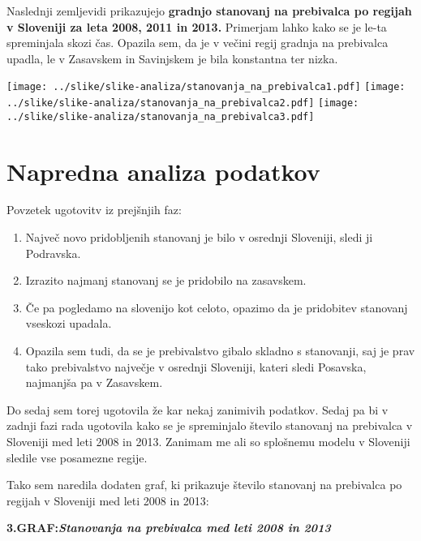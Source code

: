 \documentclass[11pt,a4paper]{article}
\begin{document}
Naslednji zemljevidi prikazujejo \textbf{gradnjo stanovanj na prebivalca po regijah v Sloveniji za leta 2008, 2011 in 2013.} Primerjam lahko kako se je le-ta spreminjala skozi čas. Opazila sem, da je v večini regij gradnja na prebivalca upadla, le v Zasavskem in Savinjskem je bila konstantna ter nizka.

\newpage
\texttt{[image: ../slike/slike-analiza/stanovanja\_na\_prebivalca1.pdf]}
\newline
\texttt{[image: ../slike/slike-analiza/stanovanja\_na\_prebivalca2.pdf]}
\newline
\texttt{[image: ../slike/slike-analiza/stanovanja\_na\_prebivalca3.pdf]}

\newpage
\section{Napredna analiza podatkov}

Povzetek ugotovitv iz prejšnjih faz:
\begin{enumerate} 
\item{Največ novo pridobljenih stanovanj je bilo v osrednji Sloveniji, sledi ji Podravska.}
\item{Izrazito najmanj stanovanj se je pridobilo na zasavskem.}
\item{Če pa pogledamo na slovenijo kot celoto, opazimo da je pridobitev stanovanj vseskozi upadala.}
\item{Opazila sem tudi, da se je prebivalstvo gibalo skladno s stanovanji, saj je prav tako prebivalstvo največje v osrednji Sloveniji, kateri sledi Posavska, najmanjša pa v Zasavskem.}
\end{enumerate}

Do sedaj sem torej ugotovila že kar nekaj zanimivih podatkov. Sedaj pa bi v zadnji fazi rada ugotovila kako se je spreminjalo število stanovanj na prebivalca v Sloveniji med leti 2008 in 2013. Zanimam me ali so splošnemu modelu v Sloveniji sledile vse posamezne regije.

\newpage
Tako sem naredila dodaten graf, ki prikazuje število stanovanj na prebivalca po regijah v Sloveniji med leti 2008 in 2013:
\newline

\textbf{3.GRAF:\emph{Stanovanja na prebivalca med leti 2008 in 2013}}\\
\newline
{}
\end{document}
